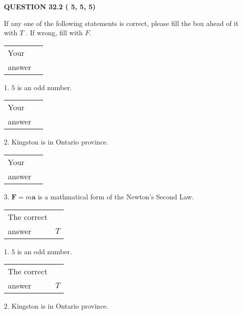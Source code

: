 \documentclass[12pt]{article}
\begin{document}
   
  
\vspace{0.2in}
  
{\textbf{\Large{QUESTION
32.2 
 (          5,          5,          5)
}}}
  
  
If any one of the following statements is correct, please fill the box ahead of it with $T$ .
If wrong, fill with $F$.
 
\noindent\begin{tabular}{|l|l|}\hline Your&\hspace{.2in} \\ answer&\hspace{.2in} \\ \hline \end{tabular}
1. $ %
5$ is an  %
odd number.
 
\noindent\begin{tabular}{|l|l|}\hline Your&\hspace{.2in} \\ answer&\hspace{.2in} \\ \hline \end{tabular}
2.  %
Kingston is in  %
Ontario province.
 
\noindent\begin{tabular}{|l|l|}\hline Your&\hspace{.2in} \\ answer&\hspace{.2in} \\ \hline \end{tabular}
3.  %
$\mathbf{F}=m\mathbf{a}$ is a mathmatical form of
the Newton's Second Law.
 
 
 
\noindent{}
 
 

 
\noindent\begin{tabular}{|l|l|}\hline The correct & \\
          answer &  %
$T$ \\ \hline \end{tabular}
1. $ %
5$ is an  %
odd number.
 
\noindent\begin{tabular}{|l|l|}\hline The correct & \\
          answer &  %
$T$ \\ \hline \end{tabular}
2.  %
Kingston is in  %
Ontario province.
 
\end{document}
